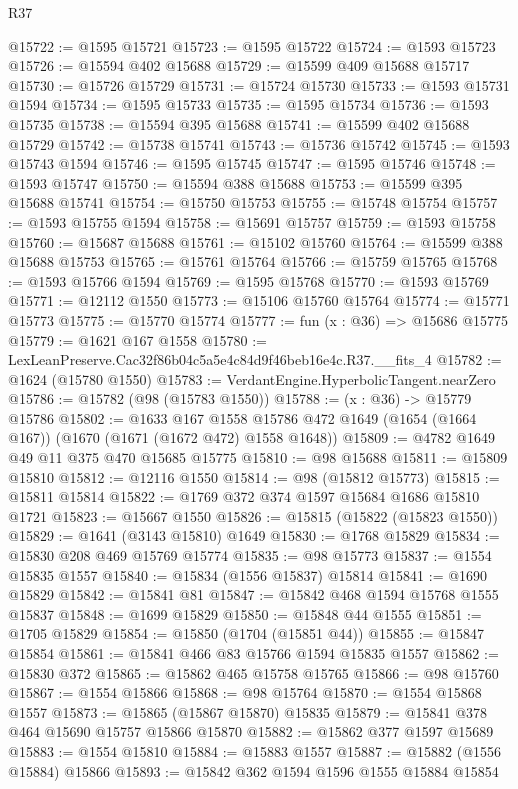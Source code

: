\begin{lexlean}{R37}
\begin{coremodule}
@15722 := @1595 @15721
@15723 := @1595 @15722
@15724 := @1593 @15723
@15726 := @15594 @402 @15688
@15729 := @15599 @409 @15688 @15717
@15730 := @15726 @15729
@15731 := @15724 @15730
@15733 := @1593 @15731 @1594
@15734 := @1595 @15733
@15735 := @1595 @15734
@15736 := @1593 @15735
@15738 := @15594 @395 @15688
@15741 := @15599 @402 @15688 @15729
@15742 := @15738 @15741
@15743 := @15736 @15742
@15745 := @1593 @15743 @1594
@15746 := @1595 @15745
@15747 := @1595 @15746
@15748 := @1593 @15747
@15750 := @15594 @388 @15688
@15753 := @15599 @395 @15688 @15741
@15754 := @15750 @15753
@15755 := @15748 @15754
@15757 := @1593 @15755 @1594
@15758 := @15691 @15757
@15759 := @1593 @15758
@15760 := @15687 @15688
@15761 := @15102 @15760
@15764 := @15599 @388 @15688 @15753
@15765 := @15761 @15764
@15766 := @15759 @15765
@15768 := @1593 @15766 @1594
@15769 := @1595 @15768
@15770 := @1593 @15769
@15771 := @12112 @1550
@15773 := @15106 @15760 @15764
@15774 := @15771 @15773
@15775 := @15770 @15774
@15777 := fun (x : @36) => @15686 @15775
@15779 := @1621 @167 @1558
@15780 := LexLeanPreserve.Cac32f86b04c5a5e4c84d9f46beb16e4c.R37.__fits_4
@15782 := @1624 (@15780 @1550)
@15783 := VerdantEngine.HyperbolicTangent.nearZero
@15786 := @15782 (@98 (@15783 @1550))
@15788 := (x : @36) -> @15779 @15786
@15802 := @1633
    @167
    @1558
    @15786
    @472
    @1649
    (@1654 (@1664 @167))
    (@1670 (@1671 (@1672 @472) @1558 @1648))
@15809 := @4782 @1649 @49 @11 @375 @470 @15685 @15775
@15810 := @98 @15688
@15811 := @15809 @15810
@15812 := @12116 @1550
@15814 := @98 (@15812 @15773)
@15815 := @15811 @15814
@15822 := @1769 @372 @374 @1597 @15684 @1686 @15810 @1721
@15823 := @15667 @1550
@15826 := @15815 (@15822 (@15823 @1550))
@15829 := @1641 (@3143 @15810) @1649
@15830 := @1768 @15829
@15834 := @15830 @208 @469 @15769 @15774
@15835 := @98 @15773
@15837 := @1554 @15835 @1557
@15840 := @15834 (@1556 @15837) @15814
@15841 := @1690 @15829
@15842 := @15841 @81
@15847 := @15842 @468 @1594 @15768 @1555 @15837
@15848 := @1699 @15829
@15850 := @15848 @44 @1555
@15851 := @1705 @15829
@15854 := @15850 (@1704 (@15851 @44))
@15855 := @15847 @15854
@15861 := @15841 @466 @83 @15766 @1594 @15835 @1557
@15862 := @15830 @372
@15865 := @15862 @465 @15758 @15765
@15866 := @98 @15760
@15867 := @1554 @15866
@15868 := @98 @15764
@15870 := @1554 @15868 @1557
@15873 := @15865 (@15867 @15870) @15835
@15879 := @15841 @378 @464 @15690 @15757 @15866 @15870
@15882 := @15862 @377 @1597 @15689
@15883 := @1554 @15810
@15884 := @15883 @1557
@15887 := @15882 (@1556 @15884) @15866
@15893 := @15842 @362 @1594 @1596 @1555 @15884 @15854

\end{coremodule}
\end{lexlean}
